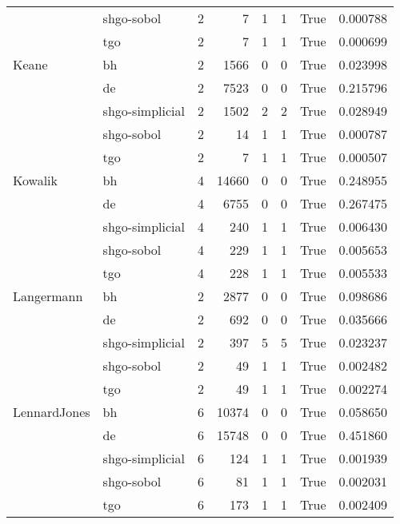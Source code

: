 \begin{longtable}{llrrrrlr}
         & shgo-sobol &     2 &        7 &      1 &       1 &    True &    0.000788 \\
         & tgo &     2 &        7 &      1 &       1 &    True &    0.000699 \\
Keane & bh &     2 &     1566 &      0 &       0 &    True &    0.023998 \\
         & de &     2 &     7523 &      0 &       0 &    True &    0.215796 \\
         & shgo-simplicial &     2 &     1502 &      2 &       2 &    True &    0.028949 \\
         & shgo-sobol &     2 &       14 &      1 &       1 &    True &    0.000787 \\
         & tgo &     2 &        7 &      1 &       1 &    True &    0.000507 \\
Kowalik & bh &     4 &    14660 &      0 &       0 &    True &    0.248955 \\
         & de &     4 &     6755 &      0 &       0 &    True &    0.267475 \\
         & shgo-simplicial &     4 &      240 &      1 &       1 &    True &    0.006430 \\
         & shgo-sobol &     4 &      229 &      1 &       1 &    True &    0.005653 \\
         & tgo &     4 &      228 &      1 &       1 &    True &    0.005533 \\
Langermann & bh &     2 &     2877 &      0 &       0 &    True &    0.098686 \\
         & de &     2 &      692 &      0 &       0 &    True &    0.035666 \\
         & shgo-simplicial &     2 &      397 &      5 &       5 &    True &    0.023237 \\
         & shgo-sobol &     2 &       49 &      1 &       1 &    True &    0.002482 \\
         & tgo &     2 &       49 &      1 &       1 &    True &    0.002274 \\
LennardJones & bh &     6 &    10374 &      0 &       0 &    True &    0.058650 \\
         & de &     6 &    15748 &      0 &       0 &    True &    0.451860 \\
         & shgo-simplicial &     6 &      124 &      1 &       1 &    True &    0.001939 \\
         & shgo-sobol &     6 &       81 &      1 &       1 &    True &    0.002031 \\
         & tgo &     6 &      173 &      1 &       1 &    True &    0.002409 \\

\end{longtable}

